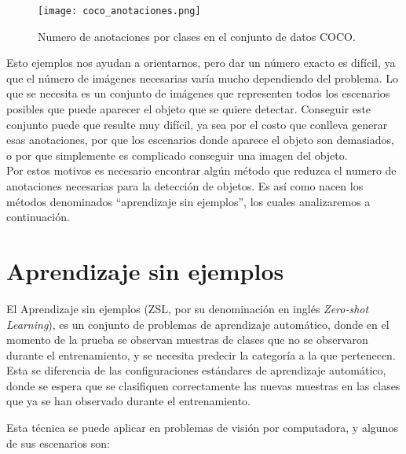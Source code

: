 \begin{figure}
	\centering
	\texttt{[image: coco\_anotaciones.png]}
	\caption{Numero de anotaciones por clases en el conjunto de datos COCO.}
	\label{fig:COCOAnotaciones}
\end{figure}

Esto ejemplos nos ayudan a orientarnos, pero dar un número exacto es difícil, ya que el número de imágenes necesarias varía mucho dependiendo del problema. Lo que se necesita es un conjunto de imágenes que representen todos los escenarios posibles que puede aparecer el objeto que se quiere detectar. Conseguir este conjunto puede que resulte muy difícil, ya sea por el costo que conlleva generar esas anotaciones, por que los escenarios donde aparece el objeto son demasiados, o por que simplemente es complicado conseguir una imagen del objeto.\\

Por estos motivos es necesario encontrar algún método que reduzca el numero de anotaciones necesarias para la detección de objetos. Es así como nacen los métodos denominados ``aprendizaje sin ejemplos'', los cuales analizaremos a continuación.
 
\section{Aprendizaje sin ejemplos} \label{sec:aprendizajesinejemplos}
El Aprendizaje sin ejemplos (ZSL, por su denominación en inglés \textit{Zero-shot Learning}), es un conjunto de problemas de aprendizaje automático, donde en el momento de la prueba se observan muestras de clases que no se observaron durante el entrenamiento, y se necesita predecir la categoría a la que pertenecen. Esta se diferencia de las configuraciones estándares de aprendizaje automático, donde se espera que se clasifiquen correctamente las nuevas muestras en las clases que ya se han observado durante el entrenamiento. 

Esta técnica se puede aplicar en problemas de visión por computadora, y algunos de sus escenarios son:


